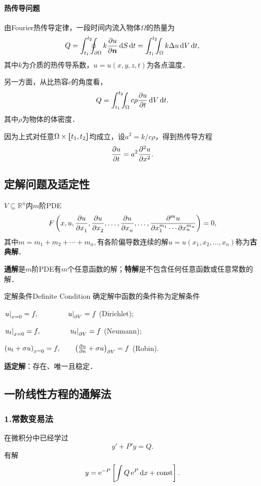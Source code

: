 \paragraph*{热传导问题}
由Fourier热传导定律，一段时间内流入物体$\Omega$的热量为
\[
	Q=\int_{t_1}^{t_2}\bs5\oint_{\p\Omega}k\pv u{\bm n}\d S\d t=\int_{t_1}^{t_2}\bs5\int_\Omega k\lap u\d V\d t,
\]
其中$k$为介质的热传导系数，$u=u(x,y,z,t)$为各点温度．

另一方面，从比热容$c$的角度看，
\[
	Q=\int_{t_1}^{t_2}\bs5\int_\Omega c\rho\pv ut\d V\d t.
\]
其中$\rho$为物体的体密度．

因为上式对任意$\Omega\times\zkh{t_1,t_2}$均成立，设$a^2=k/c\rho$，得到热传导方程
\begin{align}
	\pv ut=a^2\pv[2]ux.
\end{align}
\subsection{定解问题及适定性}
$V\subseteq\mathbb R^n$内$m$阶PDE
\[
	F\kh{x,u,\pv u{x_1},\pv u{x_2},\ldots,\pv u{x_n},\ldots,\frac{\p^mu}{\p x_1^{m_1}\cdots\p x_n^{m_n}}}=0,
\]
其中$m=m_1+m_2+\cdots+m_n,$有各阶偏导数连续的解$u=u(x_1,x_2,\ldots,x_n)$称为\textbf{古典解}．

\textbf{通解}是$m$阶PDE有$m$个任意函数的解；\textbf{特解}是不包含任何任意函数或任意常数的解．

\begin{definition}{定解条件}{Definite Condition}
	确定解中函数的条件称为定解条件
	\begin{compactenum}[I.]
		\item $\edg u_{x=0}=f,\qquad\qquad\edg u_{\p V}=f$ (Dirichlet);
		\item $\edg{u_t}_{x=0}=f,\qquad\qquad\edg{u_t}_{\p V}=f$ (Neumann);
		\item $\kh{u_t+\sigma u}_{x=0}=f,\qquad\kh{\pv un+\sigma u}_{\p V}=f$ (Robin).
	\end{compactenum}
\end{definition}
\textbf{适定解}：存在、唯一且稳定．
\subsection{一阶线性方程的通解法}
\subsubsection*{1.常数变易法}
在微积分中已经学过
\[
	y'+P'y=Q.
\]
有解
\begin{align}\label{Variation of Constant}
	y=\e{-P}\fkh{\int Q\e{P}\d x+\cns}.
\end{align}


